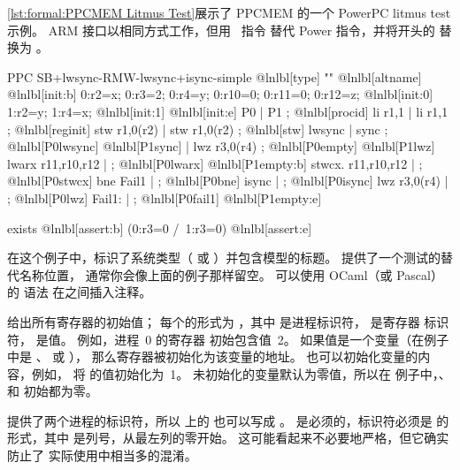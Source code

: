 \cref{lst:formal:PPCMEM Litmus Test}展示了
PPCMEM 的一个 PowerPC litmus test 示例。
ARM 接口以相同方式工作，但用 \ARM\ 指令
替代 Power 指令，并将开头的 
替换为 。

\begin{listing}
\begin{fcvlabel}
\begin{VerbatimL}[commandchars=\@\[\]]
PPC SB+lwsync-RMW-lwsync+isync-simple		@lnlbl[type]
""						@lnlbl[altname]
{						@lnlbl[init:b]
0:r2=x; 0:r3=2; 0:r4=y; 0:r10=0; 0:r11=0; 0:r12=z; @lnlbl[init:0]
1:r2=y; 1:r4=x;					@lnlbl[init:1]
}						@lnlbl[init:e]
 P0                 | P1           ;		@lnlbl[procid]
 li r1,1            | li r1,1      ;		@lnlbl[reginit]
 stw r1,0(r2)       | stw r1,0(r2) ;		@lnlbl[stw]
 lwsync             | sync         ; @lnlbl[P0lwsync] @lnlbl[P1sync]
                    | lwz r3,0(r4) ; @lnlbl[P0empty]  @lnlbl[P1lwz]
 lwarx  r11,r10,r12 | ;		@lnlbl[P0lwarx] @lnlbl[P1empty:b]
 stwcx. r11,r10,r12 | ;		@lnlbl[P0stwcx]
 bne Fail1          | ;		@lnlbl[P0bne]
 isync              | ;		@lnlbl[P0isync]
 lwz r3,0(r4)       | ;		@lnlbl[P0lwz]
 Fail1:             | ;		@lnlbl[P0fail1] @lnlbl[P1empty:e]

exists						@lnlbl[assert:b]
(0:r3=0 /\ 1:r3=0)				@lnlbl[assert:e]
\end{VerbatimL}
\end{fcvlabel}
\caption{PPCMEM 石蕊测试}
\label{lst:formal:PPCMEM Litmus Test}
\end{listing}

\begin{fcvref}
在这个例子中，标识了系统类型（ 或
）并包含模型的标题。
提供了一个测试的替代名称位置，
通常你会像上面的例子那样留空。
可以使用 OCaml（或 Pascal）的 \nbco{(* *)} 语法
在之间插入注释。

给出所有寄存器的初始值；
每个的形式为
，其中  是进程标识符， 是寄存器
标识符， 是值。
例如，进程~0 的寄存器  初始包含值~2。
如果值是一个变量（在例子中是 、 或 ），
那么寄存器被初始化为该变量的地址。
也可以初始化变量的内容，例如，
 将  的值初始化为~1。
未初始化的变量默认为零值，所以在
例子中，、 和  初始都为零。

提供了两个进程的标识符，所以
上的  也可以写成
。
是必须的，标识符必须是
 的形式，其中  是列号，从最左列的零开始。
这可能看起来不必要地严格，但它确实防止了
实际使用中相当多的混淆。
\end{fcvref}

